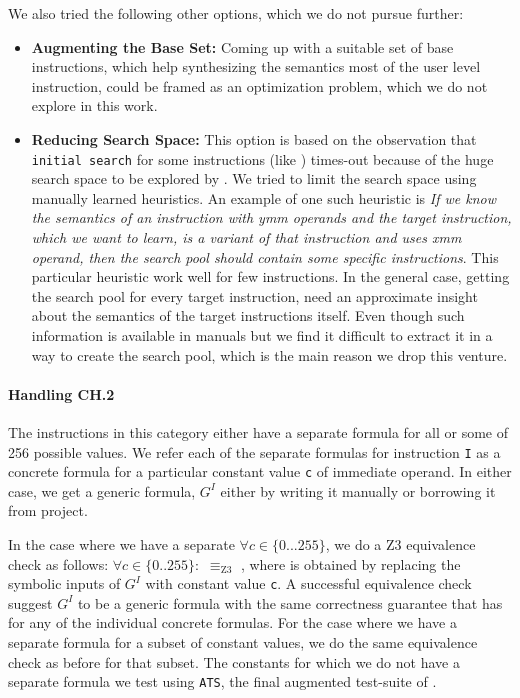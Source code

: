    We also tried the following other options, which we do not pursue further:
   \begin{itemize}
       \item \textbf{Augmenting the Base Set: }
       Coming up with a suitable set of base instructions, which help 
       synthesizing the semantics most of the user level instruction, could be framed 
       as an optimization problem, which we do not explore in this work.  
       
       \item \textbf{Reducing \Stoke Search Space: }This option is based
       on the observation that {\tt initial search} for some instructions (like
       ) times-out because of the
       huge search space to be explored by \Stoke. We tried to limit the search
       space using manually learned heuristics. An example of one such heuristic is
       \emph{ If we know the semantics of an instruction with ymm operands and the
           target instruction, which we want to learn, is a variant of that
           instruction and uses xmm operand, then the search pool should contain
           some specific instructions}. This particular heuristic  work well for few
       instructions. In the general case, getting the search pool for every
       target instruction, need an approximate insight about the semantics of
       the target instructions itself. Even though such information is available
       in manuals but we find it difficult to extract it in a way to create the
       search pool, which is the main reason we drop this venture.
   \end{itemize} 
    
   
   
   
   
   \paragraph{Handling CH.2} The instructions in this category either  have a
   separate formula for all or some of 256 possible values. We refer each of the
   separate formulas for instruction {\tt I} as a concrete formula  for
   a particular constant value {\tt c} of immediate operand.  In either case, we
   get a generic formula, $G^I$ either by writing it manually or borrowing it
   from  \Stoke project.
   
   In the case where we have a separate  $\forall c \in \{0...255\}$,
   we do a Z3 equivalence check as follows: $\forall c \in \{0..255\}:$
    $\equiv_\text{Z3}$ , where  is obtained by
   replacing the symbolic inputs of $G^I$ with constant value {\tt c}. A
   successful equivalence check suggest $G^I$ to be a generic formula with the
   same correctness guarantee that \Strata has for any of the individual
   concrete formulas. For the case where we have a separate formula for a subset
   of constant values, we do the same equivalence check as before for that
   subset. The constants for which we do not have a separate formula we test
    using {\tt ATS}, the final augmented test-suite of \Strata. 
    
